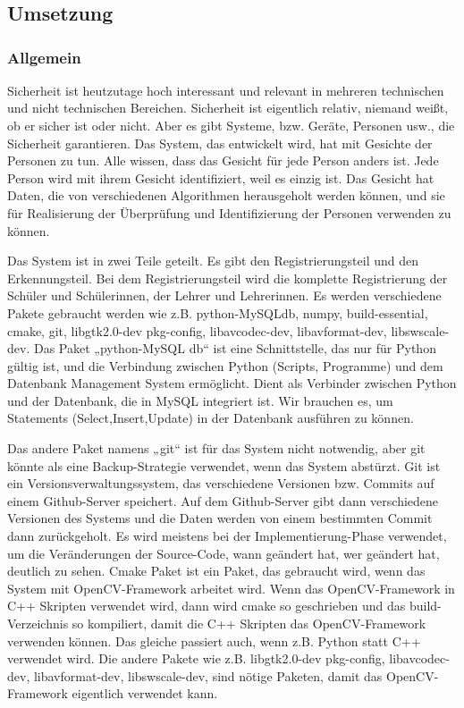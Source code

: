 \chapter{\docname}
\label{\docname}
\section{Umsetzung}
\subsection{Allgemein}
Sicherheit ist heutzutage hoch interessant und relevant in mehreren technischen und nicht technischen Bereichen. Sicherheit ist eigentlich relativ, niemand weißt, ob er sicher ist oder nicht. Aber es gibt Systeme, bzw. Geräte, Personen usw., die Sicherheit garantieren. Das System, das entwickelt wird, hat mit Gesichte der Personen zu tun. Alle wissen, dass das Gesicht für jede Person anders ist. Jede Person wird mit ihrem Gesicht identifiziert, weil es einzig ist. Das Gesicht hat Daten, die von verschiedenen Algorithmen herausgeholt werden können, und sie für Realisierung der Überprüfung und Identifizierung der Personen verwenden zu können. 

Das System ist in zwei Teile geteilt. Es gibt den Registrierungsteil und den Erkennungsteil. Bei dem Registrierungsteil wird die komplette Registrierung der Schüler und Schülerinnen, der Lehrer und Lehrerinnen. Es werden verschiedene Pakete gebraucht werden wie z.B. python-MySQLdb, numpy, build-essential, cmake, git, libgtk2.0-dev pkg-config, libavcodec-dev, libavformat-dev, libswscale-dev. Das Paket „python-MySQL
db“ ist eine Schnittstelle, das nur für Python gültig ist, und die Verbindung zwischen Python (Scripts, Programme) und dem Datenbank Management System ermöglicht. Dient als Verbinder zwischen Python und der Datenbank, die in MySQL integriert ist. Wir brauchen es, um Statements (Select,Insert,Update) in der Datenbank ausführen zu können. 

Das andere Paket namens „git“ ist für das System nicht notwendig, aber git könnte als eine Backup-Strategie verwendet, wenn das System abstürzt. Git ist ein Versionsverwaltungssystem, das verschiedene Versionen bzw. Commits auf einem Github-Server speichert. Auf dem Github-Server gibt dann verschiedene Versionen des Systems und die Daten werden von einem bestimmten Commit dann zurückgeholt. Es wird meistens bei der Implementierung-Phase verwendet, um die Veränderungen der Source-Code, wann geändert hat, wer geändert hat, deutlich zu sehen.
Cmake Paket ist ein Paket, das gebraucht wird, wenn das System mit OpenCV-Framework arbeitet wird. Wenn das OpenCV-Framework in C++ Skripten verwendet wird, dann wird cmake so geschrieben und das build-Verzeichnis so kompiliert, damit die C++ Skripten das OpenCV-Framework verwenden können. Das gleiche passiert auch, wenn z.B. Python statt C++ verwendet wird. Die andere Pakete wie z.B. libgtk2.0-dev pkg-config, libavcodec-dev, libavformat-dev, libswscale-dev, sind nötige Paketen, damit das OpenCV-Framework eigentlich verwendet kann.  
